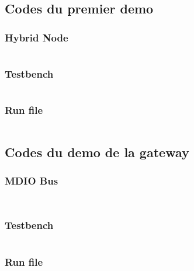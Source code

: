 \subsection{Codes du premier demo}

\subsubsection{Hybrid Node}
\label{anexe:first_demo:hybrid_node}
\inputminted[autogobble]{python}{anexes/first_demo/hybrid_node.py}

\subsubsection{Testbench}
\label{anexe:first_demo:testbench}
\inputminted[autogobble]{python}{anexes/first_demo/testbench.py}

\subsubsection{Run file}
\label{anexe:first_demo:run_file}
\inputminted[autogobble]{python}{anexes/first_demo/run_microsar.py}


\subsection{Codes du demo de la gateway}

\subsubsection{MDIO Bus}
\label{anexe:gw_demo:MDIO_Bus}
\inputminted[autogobble]{c++}{anexes/Gw_demo/mdio_bus.hpp}
\inputminted[autogobble]{c++}{anexes/Gw_demo/mdio_bus.cpp}

\subsubsection{Testbench}
\label{anexe:gw_demo:testbench}
\inputminted[autogobble]{python}{anexes/Gw_demo/testbench.py}

\subsubsection{Run file}
\label{anexe:gw_demo:run_file}
\inputminted[autogobble]{python}{anexes/Gw_demo/run_microsar.py}
